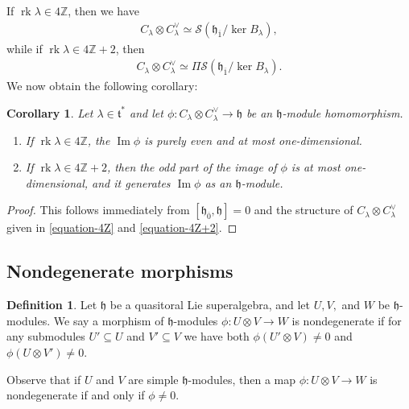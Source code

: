 \documentclass[12pt, a4paper, reqno]{amsart}
\def\h{\mathfrak{h}}
\def\ol{\overline}
\def\rk{\operatorname{rk}}
\newtheorem{corollary}{Corollary}
\theoremstyle{definition}
\newtheorem{definition}{Definition}
\theoremstyle{definition}
\theoremstyle{definition}
\numberwithin{theorem}{section}
\numberwithin{lemma}{section}
\numberwithin{remark}{section}
\numberwithin{definition}{section}
\numberwithin{corollary}{section}
\numberwithin{proposition}{section}
\numberwithin{example}{section}
\begin{document}
	If \(\rk\lambda \in 4\mathbb{Z}\), then we have
	\begin{align}\label{equation-4Z}
		C_{\lambda}\otimes C_{\lambda}^\vee \simeq \mathcal{S}(\mathfrak{h}_{\ol{1}}/\ker B_{\lambda}),
	\end{align}
	while if \(\rk\lambda \in 4\mathbb{Z}+2\), then
	\begin{align}\label{equation-4Z+2}
		C_{\lambda}\otimes C_{\lambda}^\vee \simeq \Pi\mathcal{S}(\mathfrak{h}_{\ol{1}}/\ker B_{\lambda}).
	\end{align}
	We now obtain the following corollary:
	
	\begin{corollary}\label{corollary-tensor-of-irreducibles}
		Let \(\lambda \in \mathfrak{t}^*\) and let \(\phi : C_{\lambda}\otimes C_{\lambda}^\vee \rightarrow \mathfrak{h}\) be an \(\mathfrak{h}\)-module homomorphism.
		\begin{enumerate}
			\item If \(\rk\lambda \in 4\mathbb{Z}\), the $\operatorname{Im}\phi$ is purely even and at most one-dimensional.
			\item If \(\rk\lambda \in 4\mathbb{Z}+2\), then the odd part of the image of \(\phi\) is at most one-dimensional, and it generates $\operatorname{Im}\phi$ as an \(\mathfrak{h}\)-module.
		\end{enumerate}
	\end{corollary}
	\begin{proof}
		This follows immediately from $[\h_{\ol{0}},\h]=0$ and the structure of $C_{\lambda}\otimes C_{\lambda}^\vee$ given in \eqref{equation-4Z} and \eqref{equation-4Z+2}.
	\end{proof}

	\subsection{Nondegenerate morphisms}\label{section_nondegenerate}
	
	\begin{definition}
		Let $\h$ be a quasitoral Lie superalgebra, and let $U,V,$ and $W$ be $\h$-modules.  We say a morphism of $\h$-modules $\phi:U\otimes V\to W$ is nondegenerate if for any submodules $U'\subseteq U$ and $V'\subseteq V$ we have both $\phi(U'\otimes V)\neq0$ and $\phi(U\otimes V')\neq0$.
	\end{definition}

	Observe that if $U$ and $V$ are simple $\h$-modules, then a map $\phi:U\otimes V\to W$ is nondegenerate if and only if $\phi\neq0$.
	
\end{document}
